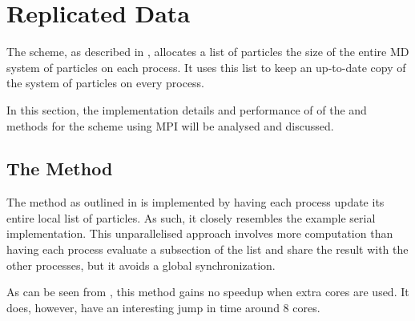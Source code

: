 \section{Replicated Data}
\label{sec:replicated_data_implementation}

%
The \replicateddata{} scheme, as described in
,
allocates a list of particles the size of
the entire MD system of particles
on each process.
%
It uses this list to keep an up-to-date copy of the system of particles
on every process.

In this section, the implementation details and performance of
of the \individualoperation{} and \pairoperation{} methods
for the \replicateddata{} scheme using MPI will be analysed and discussed.


%
%

\subsection{The \individualoperation{} Method}
\label{sec:replicated_data_individual_operation_implementation}

The \individualoperation{} method as outlined in
is implemented by having each process update
its entire local list of particles.
%
As such, it closely resembles the example serial implementation.
%
This unparallelised approach involves more computation than
having each process evaluate a subsection of the list and
share the result with the other processes,
but it avoids a global synchronization.


%

%
%
\begin{figure}[!h]
    
    \caption{
        \vZeroSpeedupCaption
            {\replicateddata{}}
            {\individualoperation{}}
    }
    \label{fig:v0_replicated_data_individual_operation_speedups}
\end{figure}


\vZeroSpeedupExplanation
    {}
    {\replicateddata{}}
    {\individualoperation{}}

As can be seen from 
,
this method gains no speedup when extra cores are used.
%
It does, however, have an interesting jump in time around 8 cores.


